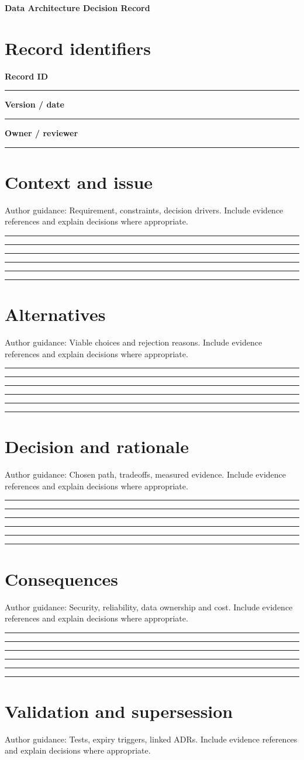 \documentclass[11pt,letterpaper]{article}
\newcommand{\ResponseLine}{\par\vspace{1.05em}\noindent\rule{\linewidth}{0.4pt}\par}
\newcommand{\ResponseArea}{\ResponseLine\ResponseLine\ResponseLine}
\begin{document}
\begin{center}
{\LARGE\bfseries\color{navy} Data Architecture Decision Record}\par
\vspace{0.25em}{\large Authoring Template | guided fields}\par
{}
\end{center}
\vspace{0.8em}
\section{Record identifiers}
\textbf{Record ID}\ResponseLine\textbf{Version / date}\ResponseLine\textbf{Owner / reviewer}\ResponseLine
\section{Context and issue}
Author guidance: Requirement, constraints, decision drivers. Include evidence references and explain decisions where appropriate.


\ResponseArea\ResponseArea
\section{Alternatives}
Author guidance: Viable choices and rejection reasons. Include evidence references and explain decisions where appropriate.


\ResponseArea\ResponseArea
\section{Decision and rationale}
Author guidance: Chosen path, tradeoffs, measured evidence. Include evidence references and explain decisions where appropriate.


\ResponseArea\ResponseArea
\section{Consequences}
Author guidance: Security, reliability, data ownership and cost. Include evidence references and explain decisions where appropriate.


\ResponseArea\ResponseArea
\section{Validation and supersession}
Author guidance: Tests, expiry triggers, linked ADRs. Include evidence references and explain decisions where appropriate.
\end{document}
